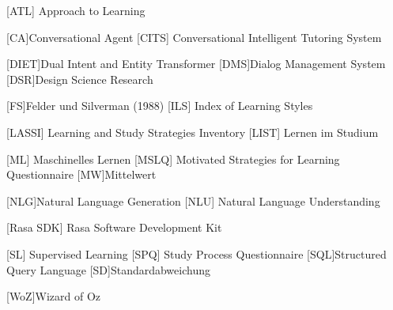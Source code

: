 
 \begin{acronym}[CA]

    [ATL]{ Approach to Learning}

    [CA]{Conversational Agent}
    [CITS]{ Conversational Intelligent Tutoring System}

    [DIET]{Dual Intent and Entity Transformer}
    [DMS]{Dialog Management System }
    [DSR]{Design Science Research}

    [FS]{Felder und Silverman (1988)}
    [ILS]{  Index of Learning Styles}


    [LASSI]{ Learning and Study Strategies Inventory}
    [LIST]{ Lernen im Studium}

    [ML]{ Maschinelles Lernen}
    [MSLQ]{ Motivated Strategies for Learning Questionnaire}
    [MW]{Mittelwert}


    [NLG]{Natural Language Generation}
    [NLU]{  Natural Language Understanding}

    [Rasa SDK]{ Rasa Software Development Kit}

    [SL]{ Supervised Learning}
    [SPQ]{  Study Process Questionnaire}
    [SQL]{Structured Query Language}
    [SD]{Standardabweichung}


    
    [WoZ]{Wizard of Oz}



\end{acronym}


